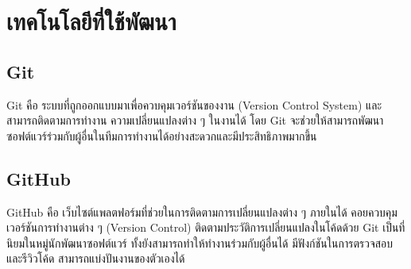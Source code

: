 \newpage

\section{เทคโนโลยีที่ใช้พัฒนา}

\subsection{Git}

Git คือ ระบบที่ถูกออกแบบมาเพื่อควบคุมเวอร์ชันของงาน (Version Control System) และสามารถติดตามการทำงาน ความเปลี่ยนแปลงต่าง ๆ ในงานได้ โดย Git จะช่วยให้สามารถพัฒนาซอฟต์แวร์ร่วมกับผู้อื่นในทีมการทำงานได้อย่างสะดวกและมีประสิทธิภาพมากขึ้น \cite{BasicGit}


\subsection{GitHub}

GitHub คือ เว็บไซต์แพลตฟอร์มที่ช่วยในการติดตามการเปลี่ยนแปลงต่าง ๆ ภายในได้ คอยควบคุมเวอร์ชันการทำงานต่าง ๆ (Version Control) ติดตามประวัติการเปลี่ยนแปลงในโค้ดด้วย Git เป็นที่นิยมในหมู่นักพัฒนาซอฟต์แวร์ ทั้งยังสามารถทำให้ทำงานร่วมกับผู้อื่นได้ มีฟังก์ชันในการตรวจสอบและรีวิวโค้ด สามารถแบ่งปันงานของตัวเองได้ \cite{VCSGitHub}











